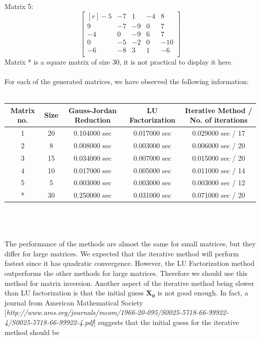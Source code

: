 \documentclass[a4paper]{article}
\newcommand{\head}[1]{\textnormal{\textbf{#1}}}
\begin{document}
			Matrix 5:
			$$\begin{bmatrix}[r]
				-5 & -7 & 1 & -4 & 8 \\
				9 & -7 & -9 & 0 & 7 \\
				-4 & 0 & -9 & 6 & 7 \\
				0 & -5 & -2 & 0 & -10 \\
				-6 & -8 & 3 & 1 & -6 \\
			\end{bmatrix}$$
			Matrix * is a square matrix of size 30, it is not practical to display it here.
			\\\\
			For each of the generated matrices, we have observed the following information:\\\\
			\begin{tabular}{c c c c c}
				\hline
				\head{Matrix no.} &\head{Size} & \head{Gauss-Jordan Reduction} & \head{LU Factorization} & \head{Iterative Method / No. of iterations} \\
				\hline
				1 & 20 & 0.104000 sec & 0.017000 sec & 0.029000 sec / 17\\
				2 & 8 & 0.008000 sec & 0.003000 sec & 0.006000 sec / 20\\
				3 & 15 & 0.034000 sec & 0.007000 sec & 0.015000 sec / 20\\
				4 & 10  & 0.017000 sec & 0.005000 sec & 0.011000 sec / 14\\
				5 & 5 & 0.003000 sec & 0.003000 sec & 0.003000 sec / 12\\
				* & 30 & 0.250000 sec & 0.031000 sec & 0.071000 sec / 20\\
				\hline
			\end{tabular}
			\\\\\\
			The performance of the methods are almost the same for small matrices, but they differ for large matrices.
			We expected that the iterative method will perform fastest since it has quadratic convergence.
			However, the LU Factorization method outperforms the other methods for large matrices.
			Therefore we should use this method for matrix inversion.
			Another aspect of the iterative method being slower than LU factorization is that the initial guess $\mathbf{X_{0}}$ is not good enough.
			In fact, a journal from American Mathematical Society [\textit{http://www.ams.org/journals/mcom/1966-20-095/S0025-5718-66-99922-4/S0025-5718-66-99922-4.pdf}]
			suggests that the initial guess for the iterative method should be
			
\end{document}
